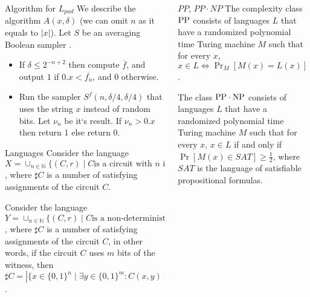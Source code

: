 \begin{frame}{}
\begin{columns}[t]
\begin{column}{0.32\linewidth}
\begin{block}{Algorithm for $L_{pad}$}
            We describe the algorithm $A(x,\delta)$  (we can omit $n$ as it equals to $|x|$).
			Let $S$ be an averaging Boolean sampler \cite{Gol11}.
            \begin{itemize}
				\item If $\delta \le 2^{-n+2}$ then compute $\overline{f}$, and
		            output $1$ if $0.x < \overline{f_n}$, and $0$ otherwise. 
				\item Run the sampler $S^f(n, \delta / 4, \delta / 4)$ that uses the
		            string $x$ instead of random bits.
					Let $\nu_n$ be it`s result. If $\nu_n> 0.x$ then return $1$ else
                    return $0$. 
			\end{itemize}
        \end{block}

        \begin{block}{Languages}
            Consider the language $X = \cup_{n \in \mathbb{N}}\{(C, r) \mid \mbox{$C$
            is a circuit with $n$ inputs}, r \in \{0, 1\}^n, \sharp C > r\}$, where
        	$\sharp C$ is a number of satisfying assignments of the circuit $C$. 

            Consider the language $Y = \cup_{n \in \mathbb{N}}\{(C,r) \mid \mbox{$C$
            is a non-deterministic circuit with $n$ inputs}, r \in \{0, 1\}^n, \sharp
          	C > r\}$, where $\sharp C$ is a number of satisfying assignments of the
            circuit $C$, in other words, if the circuit $C$ uses $m$ bits of the
            witness, then $\sharp C = |\{x \in \{0,1\}^n \mid \exists y \in
            \{0,1\}^m: C(x,y) = 1\}|$.
        \end{block}
    \end{column}%

    \begin{column}{0.32\linewidth}
        

        \begin{block}{$PP$, $PP \cdot NP$}
            The complexity class $\rm PP$ consists of languages $L$ that 
            have a randomized polynomial time Turing machine $M$ such that for every
            $x$, $x \in L \iff \Pr_M[M(x) = L(x)] \ge 1 / 2$.

            The class $\rm PP \cdot NP$ consists of languages $L$ that have a
			randomized polynomial time Turing machine $M$ such that for every $x$,
            $x \in L$ if and only if $\Pr[M(x)\in SAT]\ge \frac12$, where $SAT$ is
            the language of satisfiable propositional formulas.
        \end{block}


\end{column}
\end{columns}
\end{frame}

